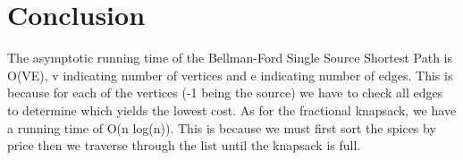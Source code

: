 \documentclass{article}
\begin{document}
\large
\section{Conclusion}
The asymptotic running time of the Bellman-Ford Single Source Shortest Path is O(VE), v indicating number of vertices and e indicating number of edges. This is because for each of the vertices (-1 being the source) we have to check all edges to determine which yields the lowest cost. As for the fractional knapsack, we have a running time of O(n log(n)). This is because we must first sort the spices by price then we traverse through the list until the knapsack is full.   
\end{document}
